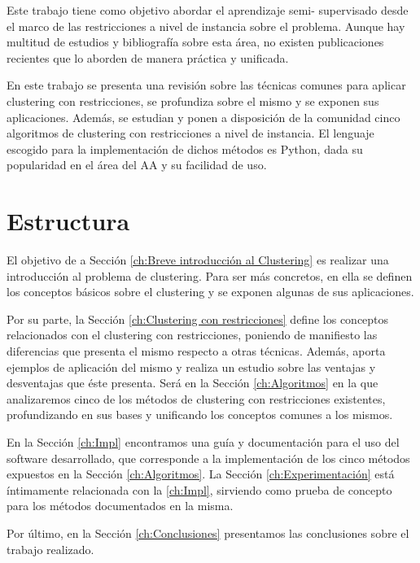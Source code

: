 Este trabajo tiene como objetivo abordar el aprendizaje semi- supervisado desde el marco de las restricciones a nivel de instancia sobre el problema. Aunque hay multitud de estudios y bibliografía sobre esta área, no existen publicaciones recientes que lo aborden de manera práctica y unificada.

En este trabajo se presenta una revisión sobre las técnicas comunes para aplicar clustering con restricciones, se profundiza sobre el mismo y se exponen sus aplicaciones. Además, se estudian y ponen a disposición de la comunidad cinco algoritmos de clustering con restricciones a nivel de instancia. El lenguaje escogido para la implementación de dichos métodos es Python, dada su popularidad en el área del \acs{AA} y su facilidad de uso.

\section{Estructura}

El objetivo de a Sección \ref{ch:Breve introducción al Clustering} es realizar una introducción al problema de clustering. Para ser más concretos, en ella se definen los conceptos básicos sobre el clustering y se exponen algunas de sus aplicaciones.

Por su parte, la Sección \ref{ch:Clustering con restricciones} define los conceptos relacionados con el clustering con restricciones, poniendo de manifiesto las diferencias que presenta el mismo respecto a otras técnicas. Además, aporta ejemplos de aplicación del mismo y realiza un estudio sobre las ventajas y desventajas que éste presenta. Será en la Sección \ref{ch:Algoritmos} en la que analizaremos cinco de los métodos de clustering con restricciones existentes, profundizando en sus bases y unificando los conceptos comunes a los mismos.

En la Sección \ref{ch:Impl} encontramos una guía y documentación para el uso del software desarrollado, que corresponde a la implementación de los cinco métodos expuestos en la Sección \ref{ch:Algoritmos}. La Sección \ref{ch:Experimentación} está íntimamente relacionada con la \ref{ch:Impl}, sirviendo como prueba de concepto para los métodos documentados en la misma.

Por último, en la Sección \ref{ch:Conclusiones} presentamos las conclusiones sobre el trabajo realizado.































